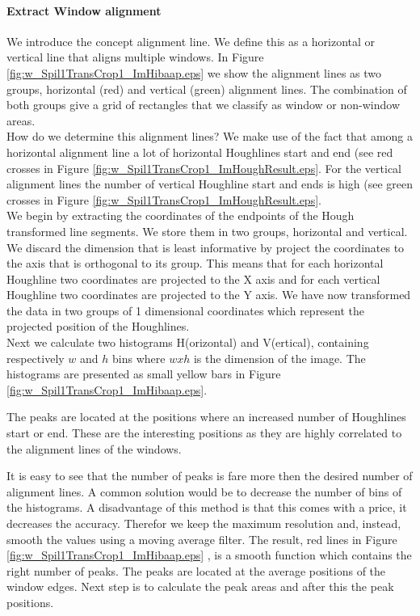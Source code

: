 \paragraph{Extract Window alignment}
We introduce the concept alignment line. We define this as a horizontal or
vertical line that aligns multiple windows. In Figure
\ref{fig:w_Spil1TransCrop1_ImHibaap.eps}
we show the alignment lines as two groups, horizontal (red) and
vertical (green) alignment lines.  The combination of both groups give a grid of
rectangles that we classify as window or non-window areas.\\

How do we determine this alignment lines? We make use of the fact that among a
horizontal alignment line a lot of horizontal Houghlines start and end (see red
crosses in Figure \ref{fig:w_Spil1TransCrop1_ImHoughResult.eps}. For the vertical alignment lines
the number of vertical Houghline start and ends is high (see green crosses in
Figure \ref{fig:w_Spil1TransCrop1_ImHoughResult.eps}.\\

We begin by extracting the coordinates of the endpoints of the Hough transformed line
segments. We store them in two groups, horizontal and vertical.%
We discard the dimension that is least informative by project the coordinates to
the axis that is orthogonal to its group. 
This means that for each horizontal Houghline two coordinates are projected to the X
axis and for each vertical Houghline two coordinates are projected to the Y
axis. We have now transformed the data in two groups of 1 dimensional
coordinates which represent the projected position of the Houghlines.\\

Next we calculate two histograms H(orizontal) and V(ertical), containing respectively
$w$ and $h$ bins where $w x h$ is the dimension of the image.  The histograms
are presented as small yellow bars in Figure \ref{fig:w_Spil1TransCrop1_ImHibaap.eps}.

The peaks are located at the positions where an increased number of Houghlines
start or end.  These are the interesting positions as they are highly correlated
to the alignment lines of the windows. 

It is easy to see that the number of peaks is fare more then the desired number of alignment lines.
A common solution would be to decrease the number of bins of the histograms. A
disadvantage of this method is that this comes with a price, it decreases the accuracy. Therefor
we keep the maximum resolution and, instead, smooth the values using a moving average filter.
The result, red lines in Figure \ref{fig:w_Spil1TransCrop1_ImHibaap.eps}
, is a smooth function which contains the right number of peaks. The peaks
are located at the average positions of the window edges. Next step is to
calculate the peak areas and after this the peak positions. 

